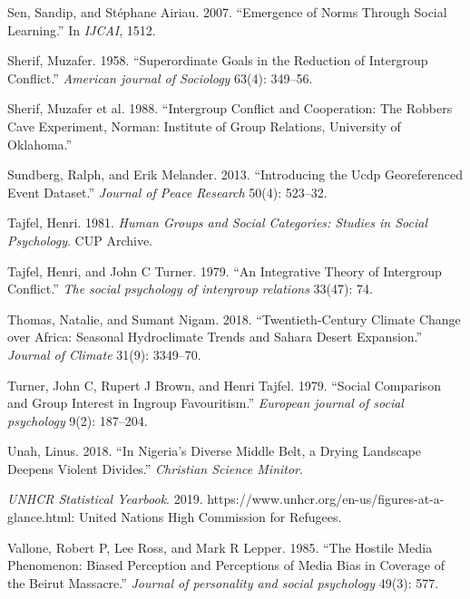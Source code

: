 \documentclass[11pt]{article}
\begin{document}
\leavevmode\hypertarget{ref-sen2007emergence}{}%
Sen, Sandip, and Stéphane Airiau. 2007. ``Emergence of Norms Through
Social Learning.'' In \emph{IJCAI}, 1512.

\leavevmode\hypertarget{ref-sherif1958superordinate}{}%
Sherif, Muzafer. 1958. ``Superordinate Goals in the Reduction of
Intergroup Conflict.'' \emph{American journal of Sociology} 63(4):
349--56.

\leavevmode\hypertarget{ref-Sherif1988robbersCave}{}%
Sherif, Muzafer et al. 1988. ``Intergroup Conflict and Cooperation: The
Robbers Cave Experiment, Norman: Institute of Group Relations,
University of Oklahoma.''

\leavevmode\hypertarget{ref-ucdp}{}%
Sundberg, Ralph, and Erik Melander. 2013. ``Introducing the Ucdp
Georeferenced Event Dataset.'' \emph{Journal of Peace Research} 50(4):
523--32.

\leavevmode\hypertarget{ref-tajfel1981groups}{}%
Tajfel, Henri. 1981. \emph{Human Groups and Social Categories: Studies
in Social Psychology}. CUP Archive.

\leavevmode\hypertarget{ref-tajfel1979integrative}{}%
Tajfel, Henri, and John C Turner. 1979. ``An Integrative Theory of
Intergroup Conflict.'' \emph{The social psychology of intergroup
relations} 33(47): 74.

\leavevmode\hypertarget{ref-thomas2018sahara}{}%
Thomas, Natalie, and Sumant Nigam. 2018. ``Twentieth-Century Climate
Change over Africa: Seasonal Hydroclimate Trends and Sahara Desert
Expansion.'' \emph{Journal of Climate} 31(9): 3349--70.

\leavevmode\hypertarget{ref-turner1979social}{}%
Turner, John C, Rupert J Brown, and Henri Tajfel. 1979. ``Social
Comparison and Group Interest in Ingroup Favouritism.'' \emph{European
journal of social psychology} 9(2): 187--204.

\leavevmode\hypertarget{ref-unah2018nigeria}{}%
Unah, Linus. 2018. ``In Nigeria's Diverse Middle Belt, a Drying
Landscape Deepens Violent Divides.'' \emph{Christian Science Minitor}.

\leavevmode\hypertarget{ref-unhcr2019}{}%
\emph{UNHCR Statistical Yearbook}. 2019.
https://www.unhcr.org/en-us/figures-at-a-glance.html: United Nations
High Commission for Refugees.

\leavevmode\hypertarget{ref-vallone1985hostileMedia}{}%
Vallone, Robert P, Lee Ross, and Mark R Lepper. 1985. ``The Hostile
Media Phenomenon: Biased Perception and Perceptions of Media Bias in
Coverage of the Beirut Massacre.'' \emph{Journal of personality and
social psychology} 49(3): 577.
\end{document}
